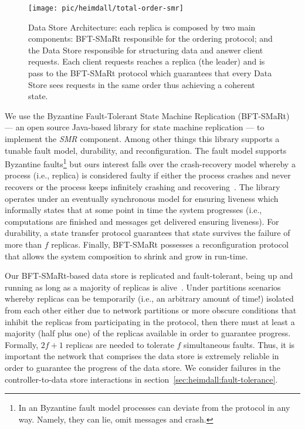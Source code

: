 \begin{figure}
  \centering
  \texttt{[image: pic/heimdall/total-order-smr]}
  \caption[Data Store Architecture]{Data Store Architecture: each replica is composed by two main components: BFT-SMaRt responsible for the ordering protocol; and the Data Store responsible for structuring data and answer client requests. Each client requests reaches a replica (the leader)  and is pass to  the BFT-SMaRt protocol which guarantees that every Data Store sees requests in the same order thus achieving a coherent state.}
  \label{fig:design:smr}
\end{figure}


We use the Byzantine Fault-Tolerant State Machine Replication (BFT-SMaRt) --- an open source Java-based library for state machine replication --- to implement the \emph{SMR} component. 
Among other things this library supports a tunable fault model, durability, and reconfiguration. 
The fault model supports Byzantine faults\footnote{In an Byzantine fault model processes can deviate from the protocol in any way.  Namely, they can lie, omit messages and crash.}   but ours interest falls over the crash-recovery model whereby a process (i.e., replica) is considered faulty if either the process crashes and never recovers or the process keeps infinitely crashing and recovering~\cite{2011itra.book.....C}. 
The library operates under an eventually synchronous model for ensuring liveness which informally states that at some point in time the system progresses (i.e., computations are finished and messages get delivered ensuring liveness). For durability, a state transfer protocol guarantees that state survives the failure of more than $f$ replicas. 
Finally, BFT-SMaRt possesses a reconfiguration protocol that allows the system composition to shrink and grow in run-time. 

Our  BFT-SMaRt-based data store  is replicated and fault-tolerant, being up and running as long as a majority of replicas is alive~\cite{Lam98}.
Under partitions scenarios whereby replicas can be temporarily  (i.e., an arbitrary amount of time!)  isolated from each other either due to network partitions or more obscure conditions that inhibit the replicas from participating in the protocol, then there must at least a majority (half plus one) of the replicas available in order to guarantee progress. 
Formally, $2f+1$ replicas are needed to tolerate $f$ simultaneous faults. Thus, it is important the network that comprises the data store is extremely reliable in order to guarantee the progress of the data store.
We consider failures in the controller-to-data store interactions in section~\ref{sec:heimdall:fault-tolerance}. 

